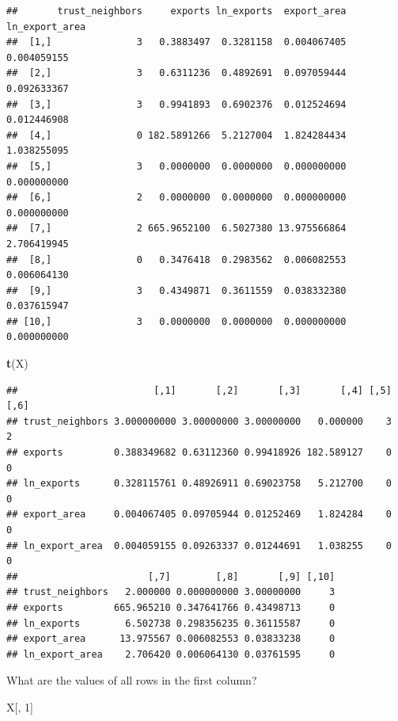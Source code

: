 \documentclass[
]{book}
\newenvironment{Shaded}{\begin{snugshade}}{\end{snugshade}}
\newcommand{\DecValTok}[1]{\textcolor[rgb]{0.00,0.00,0.81}{#1}}
\newcommand{\KeywordTok}[1]{\textcolor[rgb]{0.13,0.29,0.53}{\textbf{#1}}}
\newcommand{\NormalTok}[1]{#1}
\theoremstyle{definition}
\theoremstyle{definition}
\theoremstyle{definition}
\theoremstyle{remark}
\begin{document}
\begin{verbatim}
##       trust_neighbors     exports ln_exports  export_area ln_export_area
##  [1,]               3   0.3883497  0.3281158  0.004067405    0.004059155
##  [2,]               3   0.6311236  0.4892691  0.097059444    0.092633367
##  [3,]               3   0.9941893  0.6902376  0.012524694    0.012446908
##  [4,]               0 182.5891266  5.2127004  1.824284434    1.038255095
##  [5,]               3   0.0000000  0.0000000  0.000000000    0.000000000
##  [6,]               2   0.0000000  0.0000000  0.000000000    0.000000000
##  [7,]               2 665.9652100  6.5027380 13.975566864    2.706419945
##  [8,]               0   0.3476418  0.2983562  0.006082553    0.006064130
##  [9,]               3   0.4349871  0.3611559  0.038332380    0.037615947
## [10,]               3   0.0000000  0.0000000  0.000000000    0.000000000
\end{verbatim}

\begin{Shaded}
\begin{Highlighting}[]
\KeywordTok{t}\NormalTok{(X)}
\end{Highlighting}
\end{Shaded}

\begin{verbatim}
##                        [,1]       [,2]       [,3]       [,4] [,5] [,6]
## trust_neighbors 3.000000000 3.00000000 3.00000000   0.000000    3    2
## exports         0.388349682 0.63112360 0.99418926 182.589127    0    0
## ln_exports      0.328115761 0.48926911 0.69023758   5.212700    0    0
## export_area     0.004067405 0.09705944 0.01252469   1.824284    0    0
## ln_export_area  0.004059155 0.09263337 0.01244691   1.038255    0    0
##                       [,7]        [,8]       [,9] [,10]
## trust_neighbors   2.000000 0.000000000 3.00000000     3
## exports         665.965210 0.347641766 0.43498713     0
## ln_exports        6.502738 0.298356235 0.36115587     0
## export_area      13.975567 0.006082553 0.03833238     0
## ln_export_area    2.706420 0.006064130 0.03761595     0
\end{verbatim}

What are the values of all rows in the first column?

\begin{Shaded}
\begin{Highlighting}[]
\NormalTok{X[, }\DecValTok{1}\NormalTok{]}
\end{Highlighting}
\end{Shaded}
\end{document}
